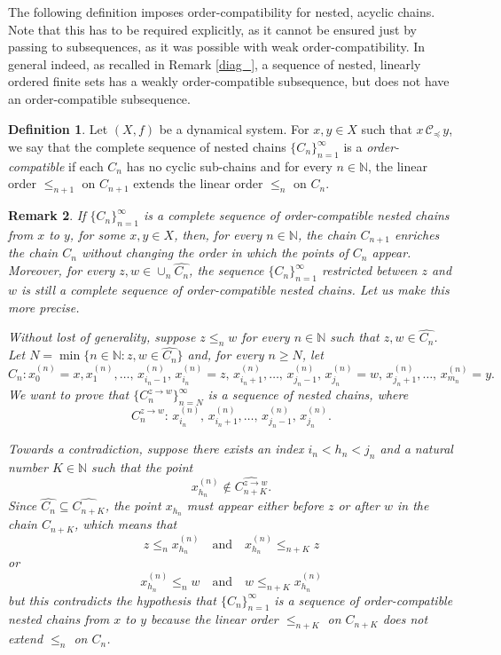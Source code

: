 \documentclass[10pt,a4paper]{article}
\theoremstyle{definition}
\newtheorem{defi}{Definition}[section]
\theoremstyle{remark}
\theoremstyle{plain}
\newtheorem{rem}[defi]{Remark}
\begin{document}
The following definition imposes  order-compatibility for nested, acyclic chains. Note that this has to be required explicitly, as it cannot be ensured just by passing to subsequences, as it was possible with weak order-compatibility. In general indeed, as recalled in Remark \ref{diag_}, a sequence of nested, linearly ordered finite sets has a weakly order-compatible subsequence, but does not have an order-compatible subsequence. 

\begin{defi}
   Let $(X,f)$ be a dynamical system. For $x,y\in X$ such that $x\,\mathcal{C_\preceq}\,y$, we say that the complete sequence of nested chains $\{C_n\}_{n=1}^\infty$ is a \emph{order-compatible} if each $C_n$ has no cyclic sub-chains and for every $n\in \mathbb{N}$, the linear order $\le_{n+1}$ on $C_{n+1}$ extends the linear order $\le_n$ on $C_n$. 
\end{defi}



\begin{rem}
    If $\{C_n\}_{n=1}^\infty$ is a complete sequence of order-compatible nested chains from $x$ to $y$, for some $x,y\in X$, then, for every $n\in\mathbb N$, the chain $C_{n+1}$ enriches the chain $C_n$ without changing the order in which the points of $C_n$ appear. Moreover, for every $z,w\in\cup_n\widehat{C_n}$, the sequence $\{C_n\}_{n=1}^\infty$ restricted between $z$ and $w$ is still a complete sequence of order-compatible nested chains.
    Let us make this more precise.

    Without lost of generality, suppose $z\le_nw$ for every $n\in\mathbb N$ such that $z,w\in\widehat{C_n}$. Let $N=\min\{n\in\mathbb N:z,w\in\widehat{C_n}\}$ and, for every $n\ge N$, let
    $$
    C_n: x_0^{(n)}=x,x^{(n)}_1,\dots,\,x^{(n)}_{i_n-1},\,x^{(n)}_{i_n}=z,\,x^{(n)}_{i_n+1},\dots,\,x^{(n)}_{j_n-1},\,x^{(n)}_{j_n}=w,\,x^{(n)}_{j_n+1},\dots,\,x^{(n)}_{m_n}=y.$$
    We want to prove that $\{C_n^{z\to w}\}_{n=N}^\infty$ is a sequence of nested chains, where 
    $$
    C_n^{z\to w}:\,x_{i_n}^{(n)},\,x_{i_n+1}^{(n)},\dots,\,x_{j_n-1}^{(n)},\,x_{j_n}^{(n)}.
    $$
    
    Towards a contradiction, suppose there exists an index $i_n<h_n<j_n$ and a natural number $K\in\mathbb N$ such that the point
    $$
    x^{(n)}_{h_n}\notin\widehat{C_{n+K}^{z\to w}}.
    $$
    Since $\widehat{C_n}\subseteq \widehat{C_{n+K}}$, the point $x_{h_n}$ must appear either before $z$ or after $w$ in the chain $C_{n+K}$, which means that
    $$z\le_n x_{h_n}^{(n)}\quad\text{and}\quad x_{h_n}^{(n)}\le_{n+K} z$$
    or
    $$x_{h_n}^{(n)}\le_n w\quad\text{and}\quad w\le_{n+K} x_{h_n}^{(n)}$$ but this contradicts the hypothesis that $\{C_n\}_{n=1}^\infty$ is a sequence of order-compatible nested chains from $x$ to $y$ because the linear order $\le_{n+K}$ on $C_{n+K}$ does not extend $\le_n$ on $C_n$.
\end{rem}
\end{document}
